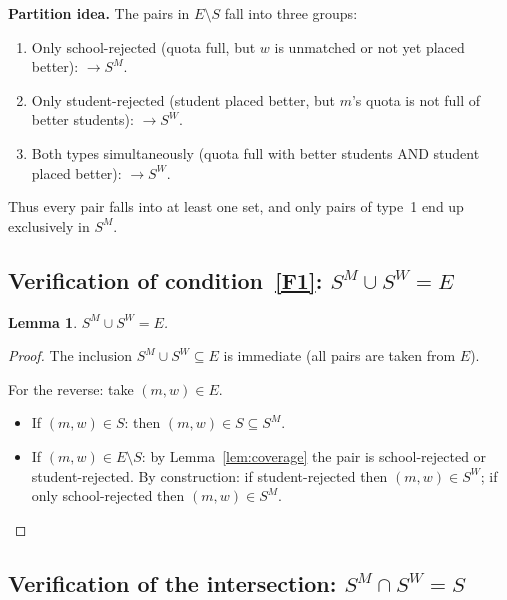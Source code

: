 \documentclass[12pt, a4paper]{article}
\theoremstyle{definition}
\theoremstyle{plain}
\newtheorem{lemma}[definition]{Lemma}
\theoremstyle{remark}
\newcommand{\SM}{S^M}
\newcommand{\SW}{S^W}
\begin{document}
\begin{bluebox}
\textbf{Partition idea.}
The pairs in $E \setminus S$ fall into three groups:
\begin{enumerate}
  \item Only school-rejected (quota full, but $w$ is unmatched or not yet
    placed better): $\to \SM$.
  \item Only student-rejected (student placed better, but $m$'s quota is not
    full of better students): $\to \SW$.
  \item Both types simultaneously (quota full with better students AND student
    placed better): $\to \SW$.
\end{enumerate}
Thus every pair falls into at least one set, and only pairs of type~1 end up
exclusively in $\SM$.
\end{bluebox}

\subsection{Verification of condition~\eqref{F1}: $\SM \cup \SW = E$}

\begin{lemma}
$\SM \cup \SW = E$.
\end{lemma}
\begin{proof}
The inclusion $\SM \cup \SW \subseteq E$ is immediate (all pairs are taken
from $E$).

For the reverse: take $(m, w) \in E$.
\begin{itemize}
  \item If $(m, w) \in S$: then $(m, w) \in S \subseteq \SM$.
  \item If $(m, w) \in E \setminus S$: by Lemma~\ref{lem:coverage} the pair
    is school-rejected or student-rejected. By construction:
    if student-rejected then $(m, w) \in \SW$;
    if only school-rejected then $(m, w) \in \SM$.\qedhere
\end{itemize}
\end{proof}

\subsection{Verification of the intersection: $\SM \cap \SW = S$}
\end{document}
